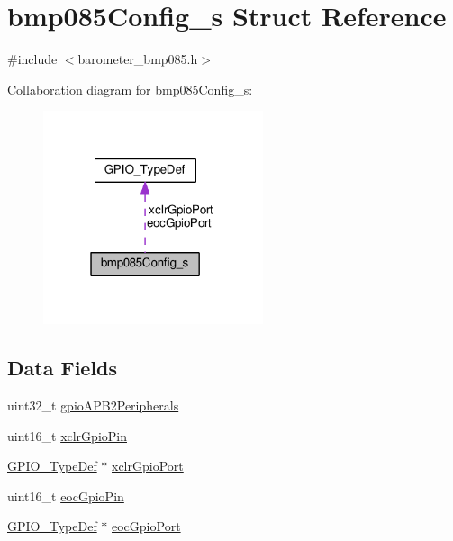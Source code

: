 \hypertarget{structbmp085Config__s}{\section{bmp085\+Config\+\_\+s Struct Reference}
\label{structbmp085Config__s}
}


{\ttfamily \#include $<$barometer\+\_\+bmp085.\+h$>$}



Collaboration diagram for bmp085\+Config\+\_\+s\+:\nopagebreak
\begin{figure}[H]
\begin{center}
\leavevmode
\includegraphics[width=183pt]{structbmp085Config__s__coll__graph}
\end{center}
\end{figure}
\subsection*{Data Fields}
\begin{DoxyCompactItemize}
\item 
uint32\+\_\+t \hyperlink{structbmp085Config__s_ab67a02d2556e65f222a2a581c532b186}{gpio\+A\+P\+B2\+Peripherals}
\item 
uint16\+\_\+t \hyperlink{structbmp085Config__s_a4159d5d72ada0c8c196f0524f76173a9}{xclr\+Gpio\+Pin}
\item 
\hyperlink{structGPIO__TypeDef}{G\+P\+I\+O\+\_\+\+Type\+Def} $\ast$ \hyperlink{structbmp085Config__s_aa7e5266260ab8a757e59fec2fd73b457}{xclr\+Gpio\+Port}
\item 
uint16\+\_\+t \hyperlink{structbmp085Config__s_a2dcd6c303bc65eb102fda6324f0374e5}{eoc\+Gpio\+Pin}
\item 
\hyperlink{structGPIO__TypeDef}{G\+P\+I\+O\+\_\+\+Type\+Def} $\ast$ \hyperlink{structbmp085Config__s_a80bb9f3de0fa322aa324724284f6a9e5}{eoc\+Gpio\+Port}
\end{DoxyCompactItemize}


